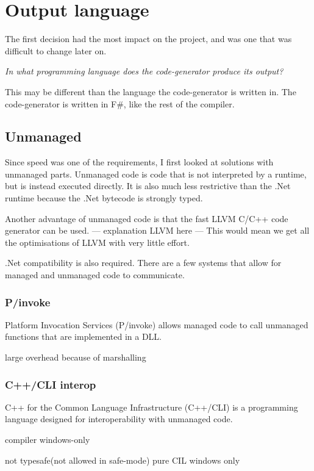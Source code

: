 \section{Output language}
The first decision had the most impact on the project, and was one that was difficult to change later on.

\textit{In what programming language does the code-generator produce its output?}

This may be different than the language the code-generator is written in.
The code-generator is written in F\#, like the rest of the compiler.


\subsection{Unmanaged}
Since speed was one of the requirements, I first looked at solutions with unmanaged parts.
Unmanaged code is code that is not interpreted by a runtime, but is instead executed directly.
It is also much less restrictive than the .Net runtime because the .Net bytecode is strongly typed.%

Another advantage of unmanaged code is that the fast LLVM C/C++ code generator can be used.
--- explanation LLVM here ---
This would mean we get all the optimisations of LLVM with very little effort.

.Net compatibility is also required.
There are a few systems that allow for managed and unmanaged code to communicate.

\subsubsection*{P/invoke}
Platform Invocation Services (P/invoke) allows managed code to call unmanaged functions that are implemented in a DLL.\cite{msdn_pinvoke}

large overhead because of marshalling \cite{msdn_interop_performance}

\subsubsection*{C++/CLI interop}
C++ for the Common Language Infrastructure (C++/CLI) is a programming language designed for interoperability with unmanaged code.%

compiler windows-only\cite{mono_c++cli}

not typesafe(not allowed in safe-mode) pure CIL windows only\cite{mono_c++cli}

